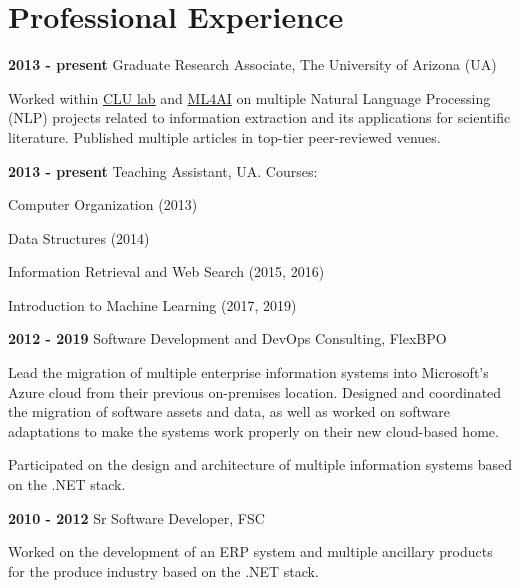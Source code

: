 \documentclass[letterpaper]{article}
\renewenvironment{itemize}{
  \begin{list}{}{
    \setlength{\leftmargin}{1.5em}
  }
}{
  \end{list}
}
\begin{document}
\section*{Professional Experience}

\begin{itemize}
\item \textbf{2013 - present} Graduate Research Associate, The University of Arizona (UA)
\item \begin{itemize}
	\item Worked within \href{http://clulab.cs.arizona.edu}{CLU lab} and \href{https://ml4ai.github.io}{ML4AI} on multiple Natural Language Processing (NLP) projects related to information extraction and its applications for scientific literature. Published multiple articles in top-tier peer-reviewed venues.
\end{itemize}
\item \textbf{2013 - present} Teaching Assistant, UA. Courses:
\item \begin{itemize}
	\item Computer Organization (2013)
	\item Data Structures (2014)
	\item Information Retrieval and Web Search (2015, 2016)
	\item Introduction to Machine Learning (2017, 2019)
\end{itemize}
\item \textbf{2012 - 2019} Software Development and DevOps Consulting, FlexBPO
\item \begin{itemize}
	\item Lead the migration of multiple enterprise information systems into Microsoft's Azure cloud from their previous on-premises location. Designed and coordinated the migration of software assets and data, as well as worked on software adaptations to make the systems work properly on their new cloud-based home.
	\item Participated on the design and architecture of multiple information systems based on the .NET stack.
\end{itemize}
\item \textbf{2010 - 2012} Sr Software Developer, FSC
\item \begin{itemize}
\item Worked on the development of an ERP system and multiple ancillary products for the produce industry based on the .NET stack.

\end{itemize}
\end{itemize}
\end{document}
